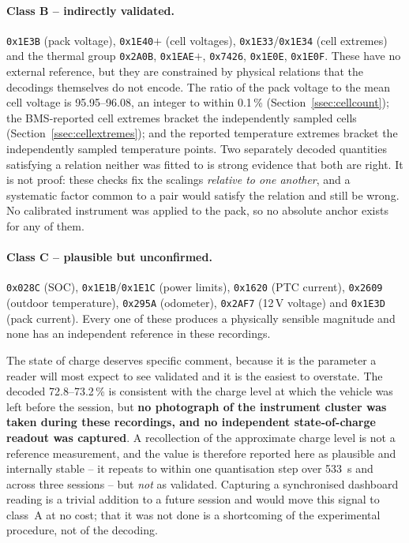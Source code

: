 \documentclass[11pt,a4paper,oneside,parskip=half]{scrreprt}
\providecommand{\hex}{}\renewcommand{\hex}[1]{\texttt{0x#1}}
\begin{document}
\paragraph{Class B -- indirectly validated.} \hex{1E3B} (pack voltage), \hex{1E40}$+$ (cell voltages), \hex{1E33}/\hex{1E34} (cell extremes) and the thermal group \hex{2A0B}, \hex{1EAE}$+$, \hex{7426}, \hex{1E0E}, \hex{1E0F}. These have no external reference, but they are constrained by physical relations that the decodings themselves do not encode. The ratio of the pack voltage to the mean cell voltage is 95.95--96.08, an integer to within 0.1\,\% (Section~\ref{ssec:cellcount}); the BMS-reported cell extremes bracket the independently sampled cells (Section~\ref{ssec:cellextremes}); and the reported temperature extremes bracket the independently sampled temperature points. Two separately decoded quantities satisfying a relation neither was fitted to is strong evidence that both are right. It is not proof: these checks fix the scalings \emph{relative to one another}, and a systematic factor common to a pair would satisfy the relation and still be wrong. No calibrated instrument was applied to the pack, so no absolute anchor exists for any of them.

\paragraph{Class C -- plausible but unconfirmed.} \hex{028C} (SOC), \hex{1E1B}/\hex{1E1C} (power limits), \hex{1620} (PTC current), \hex{2609} (outdoor temperature), \hex{295A} (odometer), \hex{2AF7} (12\,V voltage) and \hex{1E3D} (pack current). Every one of these produces a physically sensible magnitude and none has an independent reference in these recordings.

The state of charge deserves specific comment, because it is the parameter a reader will most expect to see validated and it is the easiest to overstate. The decoded 72.8--73.2\,\% is consistent with the charge level at which the vehicle was left before the session, but \textbf{no photograph of the instrument cluster was taken during these recordings, and no independent state-of-charge readout was captured}. A recollection of the approximate charge level is not a reference measurement, and the value is therefore reported here as plausible and internally stable -- it repeats to within one quantisation step over 533~s and across three sessions -- but \emph{not} as validated. Capturing a synchronised dashboard reading is a trivial addition to a future session and would move this signal to class~A at no cost; that it was not done is a shortcoming of the experimental procedure, not of the decoding.
\end{document}
